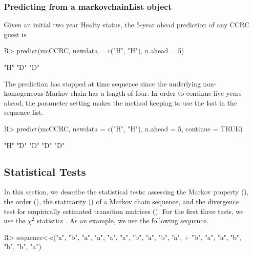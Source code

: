 \documentclass[nojss]{jss}
\begin{document}
\subsubsection{Predicting from a markovchainList object}

Given an initial two year Healty status, the 5-year ahead prediction of any
CCRC guest is

\begin{Schunk}
\begin{Sinput}
R> predict(mcCCRC, newdata = c("H", "H"), n.ahead = 5)
\end{Sinput}
\begin{Soutput}
[1] "H" "D" "D"
\end{Soutput}
\end{Schunk}

The prediction has stopped at time sequence since the underlying
non-homogeneous Markov chain has a length of four. In order to continue five
years ahead, the  parameter setting makes the 
method keeping to use the last  in the sequence list.


\begin{Schunk}
\begin{Sinput}
R> predict(mcCCRC, newdata = c("H", "H"), n.ahead = 5, continue = TRUE)
\end{Sinput}
\begin{Soutput}
[1] "H" "D" "D" "D" "D"
\end{Soutput}
\end{Schunk}

\subsection{Statistical Tests}

In this section, we describe the statistical tests: assessing the Markov property (), the order (), the statinarity () of a Markov chain sequence, and the divergence test for empirically estimated transition matrices ().
For the first three tests, we use the $\chi ^2$ statistics \citep{anderson1957statistical,MSkuriat}. 
As an example, we use the following sequence.

\begin{Schunk}
\begin{Sinput}
R> sequence<-c("a", "b", "a", "a", "a", "a", "b", "a", "b", "a", 
+              "b", "a", "a", "b", "b", "b", "a")
\end{Sinput}
\end{Schunk}
\end{document}
